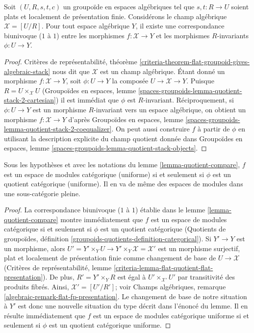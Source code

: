 \begin{lemma}
\label{lemma-quotient-compare}
Soit $(U, R, s, t, c)$ un groupoïde en espaces algébriques tel que
$s, t : R \to U$ soient plats et localement de présentation finie.
Considérons le champ algébrique $\mathcal{X} = [U/R]$.
Pour tout espace algébrique $Y$, il existe une correspondance biunivoque ($1$ à $1$) entre les
morphismes $f : \mathcal{X} \to Y$ et les morphismes $R$-invariants
$\phi : U \to Y$.
\end{lemma}

\begin{proof}
Critères de représentabilité, théorème
\ref{criteria-theorem-flat-groupoid-gives-algebraic-stack}
nous dit que $\mathcal{X}$ est un champ algébrique.
Étant donné un morphisme $f : \mathcal{X} \to Y$, soit $\phi : U \to Y$
la composée $U \to \mathcal{X} \to Y$. Puisque $R = U \times_\mathcal{X} U$
(Groupoïdes en espaces, lemme
\ref{spaces-groupoids-lemma-quotient-stack-2-cartesian})
il est immédiat que $\phi$ est $R$-invariant.
Réciproquement, si $\phi : U \to Y$ est un morphisme $R$-invariant vers
un espace algébrique, on obtient un morphisme
$f : \mathcal{X} \to Y$ d'après
Groupoïdes en espaces, lemme
\ref{spaces-groupoids-lemma-quotient-stack-2-coequalizer}.
On peut aussi construire $f$ à partir de $\phi$ en utilisant la description explicite du
champ quotient donnée dans
Groupoïdes en espaces, lemme
\ref{spaces-groupoids-lemma-quotient-stack-objects}.
\end{proof}

\begin{lemma}
\label{lemma-categorical-quotient-compare}
Sous les hypothèses et avec les notations du lemme \ref{lemma-quotient-compare},
$f$ est un espace de modules catégorique (uniforme)
si et seulement si $\phi$ est un quotient catégorique (uniforme).
Il en va de même des espaces de modules dans une sous-catégorie pleine.
\end{lemma}

\begin{proof}
La correspondance biunivoque ($1$ à $1$) établie dans le
lemme \ref{lemma-quotient-compare} montre immédiatement que $f$ est un espace de modules catégorique
si et seulement si $\phi$ est un quotient catégorique
(Quotients de groupoïdes, définition
\ref{groupoids-quotients-definition-categorical}).
Si $Y' \to Y$ est un morphisme, alors
$U' = Y' \times_Y U \to Y' \times_Y \mathcal{X} = \mathcal{X}'$
est un morphisme surjectif, plat et localement de présentation finie
comme changement de base de $U \to \mathcal{X}$
(Critères de représentabilité, lemme
\ref{criteria-lemma-flat-quotient-flat-presentation}).
De plus, $R' = Y' \times_Y R$ est égal à $U' \times_{\mathcal{X}'} U'$
par transitivité des produits fibrés.
Ainsi, $\mathcal{X}' = [U'/R']$; voir
Champs algébriques, remarque \ref{algebraic-remark-flat-fp-presentation}.
Le changement de base de notre situation à $Y'$ est donc une nouvelle situation
du type décrit dans l'énoncé du lemme. Il en
résulte immédiatement que $f$ est un espace de modules catégorique uniforme
si et seulement si $\phi$ est un quotient catégorique uniforme.
\end{proof}

